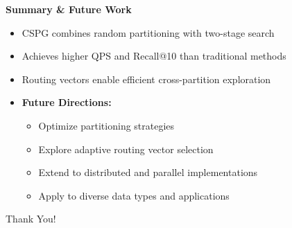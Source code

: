 \begin{frame}
\begin{center}
\LARGE\textbf{Summary \& Future Work}
\end{center}

\vspace{15pt}

\begin{itemize}
    \item CSPG combines random partitioning with two-stage search
    \item Achieves higher QPS and Recall@10 than traditional methods
    \item Routing vectors enable efficient cross-partition exploration
    
    \vspace{10pt}
    \item \textbf{Future Directions:}
    \begin{itemize}
        \item Optimize partitioning strategies
        \item Explore adaptive routing vector selection
        \item Extend to distributed and parallel implementations
        \item Apply to diverse data types and applications
    \end{itemize}
\end{itemize}

\vspace{10pt}
\begin{center}
\Large Thank You!
\end{center}
\end{frame}